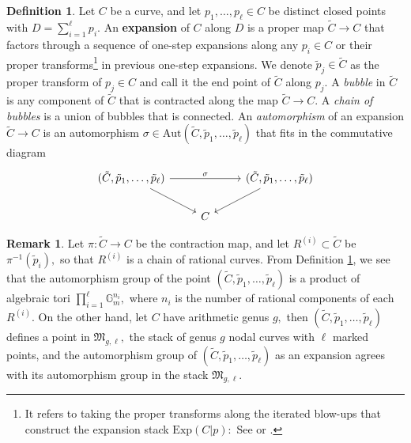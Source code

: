 \documentclass[10.5pt]{amsart}
\theoremstyle{definition}
\theoremstyle{definition}
\theoremstyle{definition}
\theoremstyle{definition}
\newtheorem{remark}[theorem]{Remark}
\newtheorem{definition}[theorem]{Definition}
\begin{document}
\begin{definition}\label{defn:singleexp}
    Let $C$ be a curve, and let $p_1,\dots,p_\ell\in C$ be distinct closed points with $D = \sum_{i=1}^\ell p_i.$ An \textbf{expansion} of $C$ along $D$ is a proper map $\tilde{C}\to C$ that factors through a sequence of one-step expansions along any $p_i\in C$ or their proper transforms\footnote{It refers to taking the proper transforms along the iterated blow-ups that construct the expansion stack $\mathrm{Exp}(C|p):$ See \cite[§1]{Li2001} or \cite[§1]{MT16}.} in previous one-step expansions. We denote $\tilde{p}_j\in \tilde{C}$ as the proper transform of $p_j\in C$ and call it the end point of $\tilde{C}$ along $p_j.$
       A \textit{bubble} in $\tilde{C}$ is any component of $\tilde{C}$ that is contracted along the map $\tilde{C}\to C.$ A \textit{chain of bubbles} is a union of bubbles that is connected. An \textit{automorphism} of an expansion $\tilde{C}\to C$ is an automorphism $\sigma\in \mathrm{Aut}(\tilde{C},\tilde{p}_1,\dots,\tilde{p}_\ell)$ that fits in the commutative diagram \[\begin{tikzcd}
	{(\tilde{C},\tilde{p}_1,\dots,\tilde{p}_\ell)} && {(\tilde{C},\tilde{p}_1,\dots,\tilde{p}_\ell)} \\
	& C
	\arrow["\sigma", from=1-1, to=1-3]
	\arrow[from=1-1, to=2-2]
	\arrow[from=1-3, to=2-2]
\end{tikzcd}\]
\end{definition}

\begin{remark}\label{rem:autgroups}
    Let $\pi: \tilde{C}\to C$ be the contraction map, and let $R^{(i)}\subset \tilde{C}$ be $\pi^{-1}(\tilde{p}_i),$ so that $R^{(i)}$ is a chain of rational curves. From Definition \ref{defn:singleexp}, we see that the automorphism group of the point $(\tilde{C},\tilde{p}_1,\dots,\tilde{p}_\ell)$ is a product of algebraic tori $\prod_{i=1}^\ell \mathbb{G}_m^{n_i},$ where $n_i$ is the number of rational components of each $R^{(i)}.$ On the other hand, let $C$ have arithmetic genus $g,$ then $(\tilde{C},\tilde{p}_1,\dots, \tilde{p}_\ell)$ defines a point in $\mathfrak{M}_{g,\ell},$ the stack of genus $g$ nodal curves with $\ell$ marked points, and the automorphism group of $(\tilde{C},\tilde{p}_1,\dots,\tilde{p}_\ell)$ as an expansion agrees with its automorphism group in the stack $\mathfrak{M}_{g,\ell}.$
\end{remark}
\end{document}

